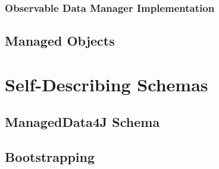 

\subsubsection{Observable Data Manager Implementation}

\subsection{Managed Objects}\label{sec:Managed Objects}

\section{Self-Describing Schemas}\label{SchemaSchema}

\subsection{ManagedData4J Schema}\label{sec:ManagedData4J Schema}

\subsection{Bootstrapping}\label{sec:Bootstrapping}

